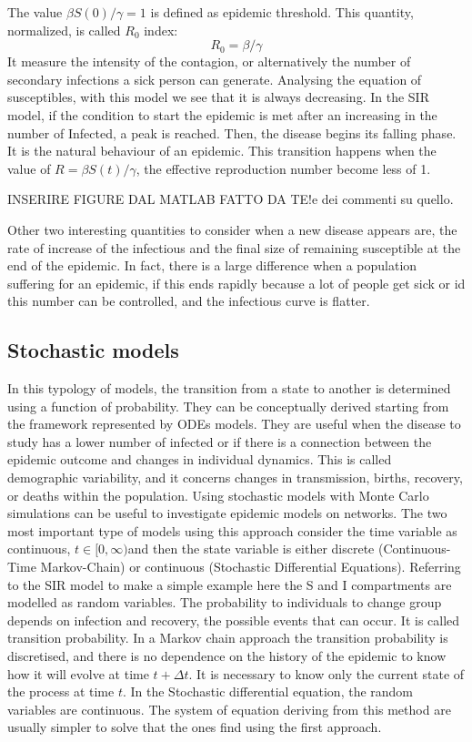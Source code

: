 The value $ \beta S(0)/\gamma = 1$ is defined as epidemic threshold. This quantity, normalized, is called $R_0$ index:
\begin{equation}
	R_0 = \beta/\gamma
	\label{eqn:basic_rep_number}
\end{equation}
It measure the intensity of the contagion, or alternatively the number of secondary infections a sick person can generate. Analysing the equation of susceptibles, with this model we see that it is always decreasing. In the SIR model, if the condition to start the epidemic is met after an increasing in the number of Infected, a peak is reached. Then, the disease begins its falling phase. It is the natural behaviour of an epidemic.
This transition happens when the value of $R = \beta S(t)/\gamma$, the effective reproduction number become less of 1.

 
INSERIRE FIGURE DAL MATLAB FATTO DA TE!e dei commenti su quello. 

Other two interesting quantities to consider when a new disease appears are, the rate of increase of the infectious and the final size of remaining susceptible at the end of the epidemic. In fact, there is a large difference when a population suffering for an epidemic, if this ends rapidly because a lot of people get sick or id this number can be controlled, and the infectious curve is flatter.

\subsection{Stochastic models}
In this typology of models, the transition from a state to another is determined using a function of probability. They can be conceptually derived starting from the framework represented by ODEs models. They are useful when the disease to study has a lower number of infected or if there is a connection between the epidemic outcome and changes in individual dynamics. This is called demographic variability, and it concerns changes in transmission, births, recovery, or deaths within the population. Using stochastic models with Monte Carlo simulations can be useful to investigate epidemic models on networks. 
The two most important type of models using this approach consider the time variable as continuous, $t \in [0, \infty) $and then the state variable is either discrete (Continuous-Time Markov-Chain) or continuous (Stochastic Differential Equations).
Referring to the SIR model to make a simple example here the S and I compartments are modelled as random variables. The probability to individuals to change group depends on infection and recovery, the possible events that can occur. It is called transition probability. 
In a Markov chain approach the transition probability is discretised, and there is no dependence on the history of the epidemic to know how it will evolve at time $t + \Delta t$. It is necessary to know only the current state of the process at time $t$. 
In the Stochastic differential equation, the random variables are continuous. The system of equation deriving from this method are usually simpler to solve that the ones find using the first approach\cite{Allen2017}.  

